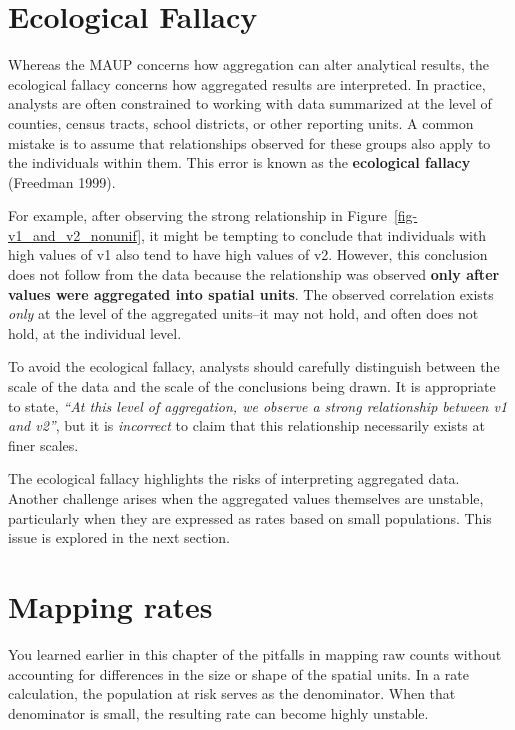 \documentclass[
  letterpaper,
]{book}
\begin{document}
\section{Ecological Fallacy}\label{ecological-fallacy}

Whereas the MAUP concerns how aggregation can alter analytical results,
the ecological fallacy concerns how aggregated results are interpreted.
In practice, analysts are often constrained to working with data
summarized at the level of counties, census tracts, school districts, or
other reporting units. A common mistake is to assume that relationships
observed for these groups also apply to the individuals within them.
This error is known as the \textbf{ecological fallacy} (Freedman 1999).

For example, after observing the strong relationship in
Figure~\ref{fig-v1_and_v2_nonunif}, it might be tempting to conclude
that individuals with high values of v1 also tend to have high values of
v2. However, this conclusion does not follow from the data because the
relationship was observed \textbf{only after values were aggregated into
spatial units}. The observed correlation exists \emph{only} at the level
of the aggregated units--it may not hold, and often does not hold, at
the individual level.

To avoid the ecological fallacy, analysts should carefully distinguish
between the scale of the data and the scale of the conclusions being
drawn. It is appropriate to state, \emph{``At this level of aggregation,
we observe a strong relationship between v1 and v2''}, but it is
\emph{incorrect} to claim that this relationship necessarily exists at
finer scales.

The ecological fallacy highlights the risks of interpreting aggregated
data. Another challenge arises when the aggregated values themselves are
unstable, particularly when they are expressed as rates based on small
populations. This issue is explored in the next section.

\section{Mapping rates}\label{mapping-rates}

You learned earlier in this chapter of the pitfalls in mapping raw
counts without accounting for differences in the size or shape of the
spatial units. In a rate calculation, the population at risk serves as
the denominator. When that denominator is small, the resulting rate can
become highly unstable.
\end{document}

